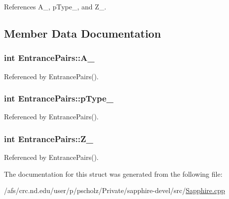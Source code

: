 References A\-\_\-, p\-Type\-\_\-, and Z\-\_\-.



\subsection{Member Data Documentation}
\hypertarget{structEntrancePairs_a6bd8b17d8247c69caf069136a78410e5}{
\subsubsection[{A\-\_\-}]{\setlength{\rightskip}{0pt plus 5cm}int Entrance\-Pairs\-::\-A\-\_\-}}\label{structEntrancePairs_a6bd8b17d8247c69caf069136a78410e5}


Referenced by Entrance\-Pairs().

\hypertarget{structEntrancePairs_adeb1d5712ece6d721bdda9eea372ea27}{
\subsubsection[{p\-Type\-\_\-}]{\setlength{\rightskip}{0pt plus 5cm}int Entrance\-Pairs\-::p\-Type\-\_\-}}\label{structEntrancePairs_adeb1d5712ece6d721bdda9eea372ea27}


Referenced by Entrance\-Pairs().

\hypertarget{structEntrancePairs_a1381c1f783a84f47b20d8ba994bd6c3c}{
\subsubsection[{Z\-\_\-}]{\setlength{\rightskip}{0pt plus 5cm}int Entrance\-Pairs\-::\-Z\-\_\-}}\label{structEntrancePairs_a1381c1f783a84f47b20d8ba994bd6c3c}


Referenced by Entrance\-Pairs().



The documentation for this struct was generated from the following file\-:\begin{DoxyCompactItemize}
\item 
/afs/crc.\-nd.\-edu/user/p/pscholz/\-Private/sapphire-\/devel/src/\hyperlink{Sapphire_8cpp}{Sapphire.\-cpp}\end{DoxyCompactItemize}
